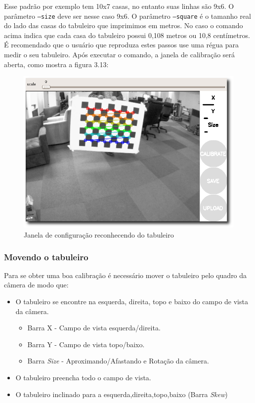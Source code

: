 Esse padrão por exemplo tem 10x7 casas, no entanto suas linhas são 9x6. O parâmetro \texttt{--size} deve ser nesse caso 9x6.
O parâmetro \texttt{--square} é o tamanho real do lado das casas do tabuleiro que imprimimos em metros. No caso o comando acima indica que cada casa do tabuleiro possui 0,108 metros ou 10,8 centímetros. É recomendado que o usuário que reproduza estes passos use uma régua para medir o seu tabuleiro.
Após executar o comando, a janela de calibração será aberta, como mostra a figura 3.13:

\begin{figure}[!htb]
	\centering
		\includegraphics[width= \textwidth]{Imagens/figura3-13.png}
	\caption{Janela de configuração reconhecendo do tabuleiro}
	\label{fig3:13}
\end{figure}

\subsubsection{Movendo o tabuleiro}

Para se obter uma boa calibração é necessário mover o tabuleiro pelo quadro da câmera de modo que:

\begin{itemize}
	\item{O tabuleiro se encontre na esquerda, direita, topo e baixo do campo de vista da câmera.}
	\begin{itemize}
		\item{Barra X - Campo de vista esquerda/direita.}
		\item{Barra Y - Campo de vista topo/baixo.}
		\item{Barra \textit{Size} - Aproximando/Afastando e Rotação da câmera.}
	\end{itemize}
	\item{O tabuleiro preencha todo o campo de vista.}
	\item{O tabuleiro inclinado para a esquerda,direita,topo,baixo (Barra \textit{Skew})}
\end{itemize}

